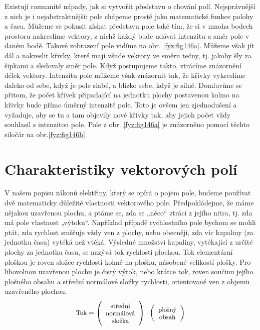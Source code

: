       Existují rozmanité nápady, jak si vytvořit představu o chování polí. Nejsprávnější z nich je i
      nejabstraktnější: pole chápeme prostě jako matematické funkce polohy a času. Můžeme se 
      pokusit získat představu pole také tím, že si v mnoha bodech prostoru nakreslíme vektory, z 
      nichž každý bude udávat intenzitu a směr pole v daném bodě. Takové zobrazení pole vidíme na 
      obr. \ref{fyz:fig146a}. Můžeme však jít dál a nakreslit křivky, které mají všude vektory 
      ve směru tečny, tj. jakoby šly za šipkami a sledovaly směr pole. Když postupujeme takto, 
      ztrácíme znázornění délek vektory. Intenzitu pole můžeme však znázornit tak, že křivky 
      vykreslíme daleko od sebe, když je pole slabé, a blízko sebe, když je silné. Domluvíme se 
      přitom, že počet křivek připadající na jednotku plochy postavenou kolmo na křivky 
      bude přímo úměrný intenzitě pole. Toto je ovšem jen zjednodušení a vyžaduje, aby se tu a tam 
      objevily nové křivky tak, aby jejich počet vždy souhlasil s intenzitou pole. Pole z obr. 
      \ref{fyz:fig146a} je znázorněno pomocí těchto siločár na obr.\ref{fyz:fig146b}.

        
  \section{Charakteristiky vektorových polí}
    V našem popisu zákonů elektřiny, který se opírá o pojem pole, budeme používat dvě matematicky 
    důležité vlastnosti vektorového pole. Předpokládejme, že máme nějakou uzavřenou plochu, a ptáme 
    se, zda se „něco“ ztrácí z jejího nitra, tj. zda má pole vlastnost „výtoku“. Například případě 
    rychlostního pole bychom se mohli ptát, zda rychlost směřuje vždy ven z plochy, nebo obecněji, 
    zda víc kapaliny (za jednotku času) vytéká než vtéká. Výsledné množství kapaliny, vytékající z 
    určité plochy za jednotku času, se nazývá tok rychlosti plochou. Tok elementární ploškou je 
    roven složce rychlosti kolmé na plošku, násobené velikostí plošky. Pro libovolnou uzavřenou 
    plochu je čistý výtok, nebo krátce tok, roven součinu jejího plošného obsahu a střední 
    normálové složky rychlosti, orientované ven z objemu uzavřeného plochou:    
    \begin{equation}\label{fyz:eq_fey_elmag04}
      \renewcommand\arraystretch{0.6} \setlength\minrowclearance{2.4pt}
      \small
      \text{Tok} = 
        \left(\begin{array}{c}
          \text{střední}      \\
          \text{normálová} \\
          \text{složka}
        \end{array}
      \right)\cdot
      \left(\begin{array}{c}
          \text{plošný}      \\
          \text{obsah}
        \end{array}
      \right)
    \end{equation}
    
